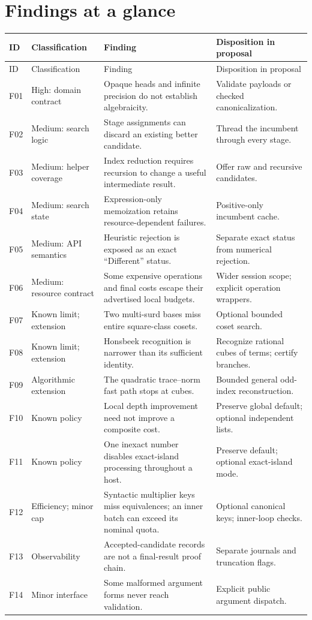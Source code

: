 \documentclass[11pt,letterpaper]{article}
\numberwithin{equation}{section}
\theoremstyle{definition}\newtheorem{definition}[theorem]{Definition}
\theoremstyle{remark}\newtheorem{remark}[theorem]{Remark}
\begin{document}
\section{Findings at a glance}
\label{sec:findings}
\small
\begin{longtable}{@{}P{0.075\textwidth}P{0.19\textwidth}P{0.415\textwidth}P{0.245\textwidth}@{}}
\toprule
ID & Classification & Finding & Disposition in proposal\\\midrule
\endfirsthead
\toprule ID & Classification & Finding & Disposition in proposal\\\midrule\endhead
F01 & High: domain contract & Opaque heads and infinite precision do not establish algebraicity. & Validate payloads or checked canonicalization.\\
F02 & Medium: search logic & Stage assignments can discard an existing better candidate. & Thread the incumbent through every stage.\\
F03 & Medium: helper coverage & Index reduction requires recursion to change a useful intermediate result. & Offer raw and recursive candidates.\\
F04 & Medium: search state & Expression-only memoization retains resource-dependent failures. & Positive-only incumbent cache.\\
F05 & Medium: API semantics & Heuristic rejection is exposed as an exact ``Different'' status. & Separate exact status from numerical rejection.\\
F06 & Medium: resource contract & Some expensive operations and final costs escape their advertised local budgets. & Wider session scope; explicit operation wrappers.\\
F07 & Known limit; extension & Two multi-surd bases miss entire square-class cosets. & Optional bounded coset search.\\
F08 & Known limit; extension & Honsbeek recognition is narrower than its sufficient identity. & Recognize rational cubes of terms; certify branches.\\
F09 & Algorithmic extension & The quadratic trace--norm fast path stops at cubes. & Bounded general odd-index reconstruction.\\
F10 & Known policy & Local depth improvement need not improve a composite cost. & Preserve global default; optional independent lists.\\
F11 & Known policy & One inexact number disables exact-island processing throughout a host. & Preserve default; optional exact-island mode.\\
F12 & Efficiency; minor cap & Syntactic multiplier keys miss equivalences; an inner batch can exceed its nominal quota. & Optional canonical keys; inner-loop checks.\\
F13 & Observability & Accepted-candidate records are not a final-result proof chain. & Separate journals and truncation flags.\\
F14 & Minor interface & Some malformed argument forms never reach validation. & Explicit public argument dispatch.\\
\bottomrule
\end{longtable}
\end{document}

